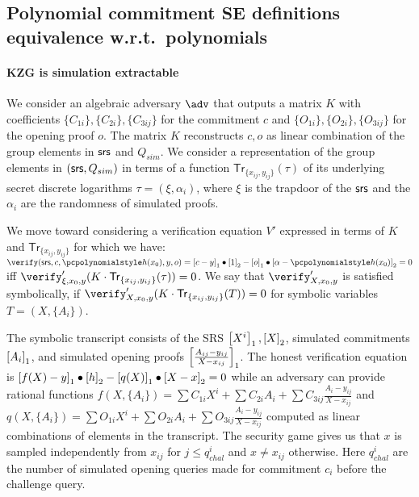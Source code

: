 \documentclass[runningheads,11pt]{llncs}
\begin{document}
\subsection{Polynomial commitment SE definitions equivalence w.r.t.~polynomials}

\paragraph{KZG is simulation extractable}

We consider an algebraic adversary $\adv$ that outputs a matrix $K$ with coefficients
$\{C_{{1i}}\},\{C_{{2i}}\}, \{C_{{3ij}}\}$ for the commitment $c$ and
$\{O_{{1i}}\},\{O_{{2i}}\}, \{O_{{3ij}}\}$ for the opening proof $o$. The matrix $K$
reconstructs $c,o$ as linear combination of the group elements in $\mathsf{srs}$ and
$Q_{sim}$. We consider a representation of the group elements in $(\mathsf{srs}, Q_{{sim}})$
in terms of a function $\mathsf{Tr}_{\{x_{ij},y_{ij}\}}(\tau)$ of its underlying
secret discrete logarithms $\tau= (\xi, \alpha_{i})$, where $\xi$ is the trapdoor of
the $\mathsf{srs}$ and the $\alpha_{i}$ are the randomness of simulated proofs.

We move toward considering a verification equation $V'$ expressed in terms of $K$ and
$\mathsf{Tr}_{\{x_{ij},y_{ij}\}}$ for which we have:
$\verify (\srs, c, \p{h} (x_0), y, o) = \gone{c - y} \bullet \gtwo{1} - \gone{o} \bullet
\gtwo{\alpha - \p{h} (x_0)} = 0$ iff
$\verify'_{{\xi, x_0, y}}(K \cdot \mathsf{Tr}_{\{x_{ij},y_{ij}\}} (\tau)) = 0$. 
%
We say that $\verify'_{{X,x_0,y}}$ is satisfied symbolically, if
$\verify'_{{X,x_0,y}}(K \cdot \mathsf{Tr}_{\{x_{ij},y_{ij}\}} (T)) = 0$ for symbolic
variables $T=(X, \{A_{i}\})$. 

The symbolic transcript consists of the SRS $\left[X^{i}\right]_{1}, \left[X\right]_{2}$, simulated
commitments $\left[A_{i}\right]_{1}$, and simulated opening proofs
$ \left[\frac{A_{ij}-y_{{ij}}}{X-x_{ij}}\right]_{1}$.
%
The honest verification equation is
$\left[f(X) - y\right]_{1} \bullet \left[h\right]_{2} - \left[q(X)\right]_{1} \bullet \left[X - x\right]_{2} = 0$ while an
adversary can provide rational functions
$f(X, \{A_{i}\}) = \sum C_{1i} X^{i} + \sum C_{2i} A_{i} + \sum C_{3ij}
\frac{A_{i}-y_{ij}}{X-x_{ij}}$ and
$q(X, \{A_{i}\}) = \sum O_{1i} X^{i} + \sum O_{2i} A_{i} + \sum O_{3ij} \frac{A_{i}-
  y_{ij}}{X-x_{ij}}$ computed as linear combinations of elements in the transcript.
The security game gives us that $x$ is sampled independently from $x_{ij}$ for
$j\leq q^{i}_{chal}$ and $x \neq x_{ij}$ otherwise. Here $q^{i}_{chal}$ are the
number of simulated opening queries made for commitment $c_{i}$ before the challenge
query.
\end{document}
